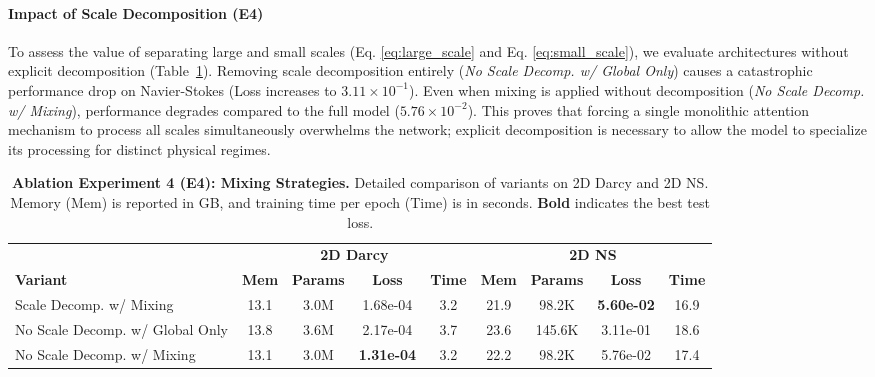\documentclass[final,3p,times]{elsarticle}
\begin{document}
\paragraph{Impact of Scale Decomposition (E4)}
To assess the value of separating large and small scales (Eq. \eqref{eq:large_scale} and Eq. \eqref{eq:small_scale}), we evaluate architectures without explicit decomposition (Table~\ref{tab:ablation_e4}). Removing scale decomposition entirely (\textit{No Scale Decomp. w/ Global Only}) causes a catastrophic performance drop on Navier-Stokes (Loss increases to $3.11 \times 10^{-1}$). Even when mixing is applied without decomposition (\textit{No Scale Decomp. w/ Mixing}), performance degrades compared to the full model ($5.76 \times 10^{-2}$). This proves that forcing a single monolithic attention mechanism to process all scales simultaneously overwhelms the network; explicit decomposition is necessary to allow the model to specialize its processing for distinct physical regimes.
\begin{table}[htbp]
  \centering
  \small
  \setlength{\tabcolsep}{4pt}
  \renewcommand{\arraystretch}{1.2}
  \caption{\textbf{Ablation Experiment 4 (E4): Mixing Strategies.} Detailed comparison of variants on 2D Darcy and 2D NS. Memory (Mem) is reported in GB, and training time per epoch (Time) is in seconds. \textbf{Bold} indicates the best test loss.}
  \label{tab:ablation_e4}
  \begin{tabular}{l c c c c c c c c}
    \toprule
    & \multicolumn{4}{c}{\textbf{2D Darcy}} & \multicolumn{4}{c}{\textbf{2D NS}} \\
    \cmidrule(lr){2-5} \cmidrule(lr){6-9}
    \textbf{Variant} & \textbf{Mem} & \textbf{Params} & {\textbf{Loss}} & \textbf{Time} & \textbf{Mem} & \textbf{Params} & {\textbf{Loss}} & \textbf{Time} \\
    \midrule
    Scale Decomp. w/ Mixing & 13.1 & 3.0M & 1.68e-04 & 3.2 & 21.9 & 98.2K & {\textbf{5.60e-02}} & 16.9 \\
    No Scale Decomp. w/ Global Only & 13.8 & 3.6M & 2.17e-04 & 3.7 & 23.6 & 145.6K & 3.11e-01 & 18.6 \\
    No Scale Decomp. w/ Mixing & 13.1 & 3.0M & {\textbf{1.31e-04}} & 3.2 & 22.2 & 98.2K & 5.76e-02 & 17.4 \\
    \bottomrule
  \end{tabular}
\end{table}
\end{document}
